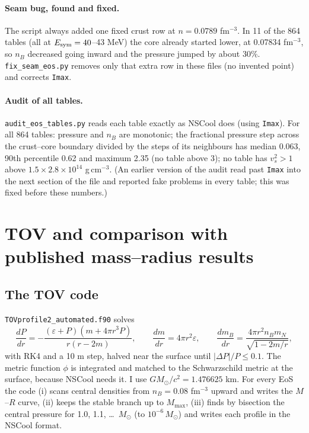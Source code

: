 \documentclass[11pt,a4paper]{article}
\newcommand{\Esym}{E_{\rm sym}}
\newcommand{\Msun}{M_\odot}
\begin{document}
\paragraph{Seam bug, found and fixed.} The script always added one fixed crust row at $n=0.0789$ fm$^{-3}$. In 11 of the 864 tables (all at $\Esym=40$--43 MeV) the core already started lower, at 0.07834 fm$^{-3}$, so $n_B$ decreased going inward and the pressure jumped by about 30\%. \texttt{fix\_seam\_eos.py} removes only that extra row in these files (no invented point) and corrects \texttt{Imax}.

\paragraph{Audit of all tables.} \texttt{audit\_eos\_tables.py} reads each table exactly as NSCool does (using \texttt{Imax}). For all 864 tables: pressure and $n_B$ are monotonic; the fractional pressure step across the crust--core boundary divided by the steps of its neighbours has median 0.063, 90th percentile 0.62 and maximum 2.35 (no table above 3); no table has $v_s^2>1$ above $1.5\times2.8\times10^{14}$ g\,cm$^{-3}$. (An earlier version of the audit read past \texttt{Imax} into the next section of the file and reported fake problems in every table; this was fixed before these numbers.)

\section{TOV and comparison with published mass--radius results}\label{sec:tov}
\subsection{The TOV code}
\texttt{TOVprofile2\_automated.f90} solves \cite{Tolman1939,OV1939}
\begin{equation}
\frac{dP}{dr}=-\frac{(\varepsilon+P)(m+4\pi r^3P)}{r(r-2m)},\qquad \frac{dm}{dr}=4\pi r^2\varepsilon,\qquad
\frac{dm_B}{dr}=\frac{4\pi r^2 n_B m_N}{\sqrt{1-2m/r}},
\end{equation}
with RK4 and a 10 m step, halved near the surface until $|\Delta P|/P\le0.1$. The metric function $\phi$ is integrated and matched to the Schwarzschild metric at the surface, because NSCool needs it. I use $GM_\odot/c^2=1.476625$ km. For every EoS the code (i) scans central densities from $n_B=0.08$ fm$^{-3}$ upward and writes the $M$--$R$ curve, (ii) keeps the stable branch up to $M_{\max}$, (iii) finds by bisection the central pressure for 1.0, 1.1, \dots\ $\Msun$ (to $10^{-6}\,\Msun$) and writes each profile in the NSCool format.
\end{document}
